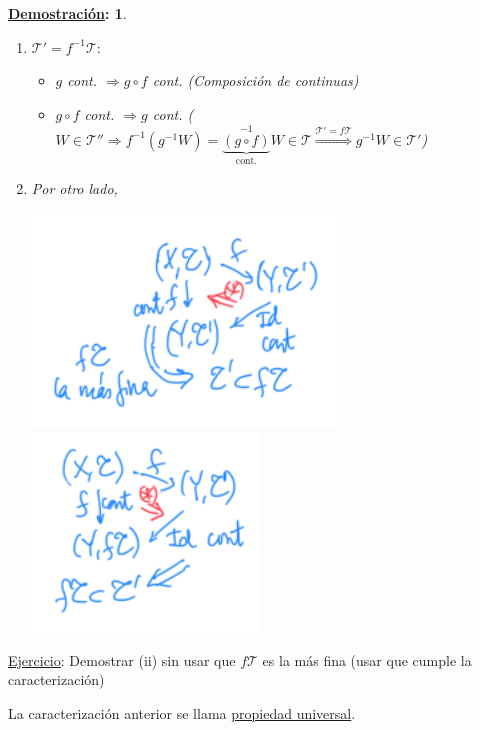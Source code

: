 \documentclass[10pt,a4paper,openright]{book}
\theoremstyle{break}
\newtheorem*{demo}{\underline{Demostración}:}
\begin{document}
\begin{demo}
\begin{enumerate}
    \item $\mathcal{T}' = f^{-1}\mathcal{T}: $ 
    \begin{itemize}
        \item $g$ cont. $\Rightarrow g \circ f$ cont. (Composición de continuas)
        \item $g \circ f$ cont. $\Rightarrow g$ cont. ($W \in \mathcal{T}'' \Rightarrow f^{-1}\left( g^{-1} W \right) = \underbrace{\left( g \circ f \right)}_{\text{cont.}}^{-1} W \in \mathcal{T} \stackrel{\mathcal{T}' = f\mathcal{T}}{\Rightarrow} g^{-1}W \in \mathcal{T}'$)
    \end{itemize}

    \item Por otro lado,
    \begin{center}
        \includegraphics[scale=0.4]{images/dem_carac_img_dir_1} 
        \includegraphics[scale=0.4]{images/dem_carac_img_dir_2} 
    \end{center}
\end{enumerate}
\end{demo}

\underline{Ejercicio}: Demostrar (ii) sin usar que $f\mathcal{T}$ es la más fina (usar que cumple la caracterización)

La caracterización anterior se llama \underline{propiedad universal}.
\end{document}

